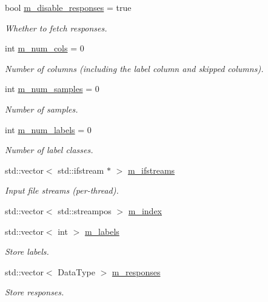 \begin{DoxyCompactItemize}
bool \hyperlink{classlbann_1_1csv__reader_a1e133c3585df5f131b4772f618e77ad2}{m\+\_\+disable\+\_\+responses} = true
\begin{DoxyCompactList}\small\item\em Whether to fetch responses. \end{DoxyCompactList}\item 
int \hyperlink{classlbann_1_1csv__reader_a7607d3f6b356538671147a0b8f7b09c8}{m\+\_\+num\+\_\+cols} = 0
\begin{DoxyCompactList}\small\item\em Number of columns (including the label column and skipped columns). \end{DoxyCompactList}\item 
int \hyperlink{classlbann_1_1csv__reader_a37ee216c31ea3d7919fce58215ec410a}{m\+\_\+num\+\_\+samples} = 0
\begin{DoxyCompactList}\small\item\em Number of samples. \end{DoxyCompactList}\item 
int \hyperlink{classlbann_1_1csv__reader_a8e377a058039b3d906738143356b93e4}{m\+\_\+num\+\_\+labels} = 0
\begin{DoxyCompactList}\small\item\em Number of label classes. \end{DoxyCompactList}\item 
std\+::vector$<$ std\+::ifstream $\ast$ $>$ \hyperlink{classlbann_1_1csv__reader_a41ede08dd2ed420bf8f6c6670d892caf}{m\+\_\+ifstreams}
\begin{DoxyCompactList}\small\item\em Input file streams (per-\/thread). \end{DoxyCompactList}\item 
std\+::vector$<$ std\+::streampos $>$ \hyperlink{classlbann_1_1csv__reader_a2a959e7839d2d11e2deba98ba1884006}{m\+\_\+index}
\item 
std\+::vector$<$ int $>$ \hyperlink{classlbann_1_1csv__reader_a1f11d02df556a4ec638f332ccfc03eb2}{m\+\_\+labels}
\begin{DoxyCompactList}\small\item\em Store labels. \end{DoxyCompactList}\item 
std\+::vector$<$ Data\+Type $>$ \hyperlink{classlbann_1_1csv__reader_a8b7e23827c7cbf7c8eff40cad9cb6afc}{m\+\_\+responses}
\begin{DoxyCompactList}\small\item\em Store responses. \end{DoxyCompactList}\item 

\end{DoxyCompactItemize}
